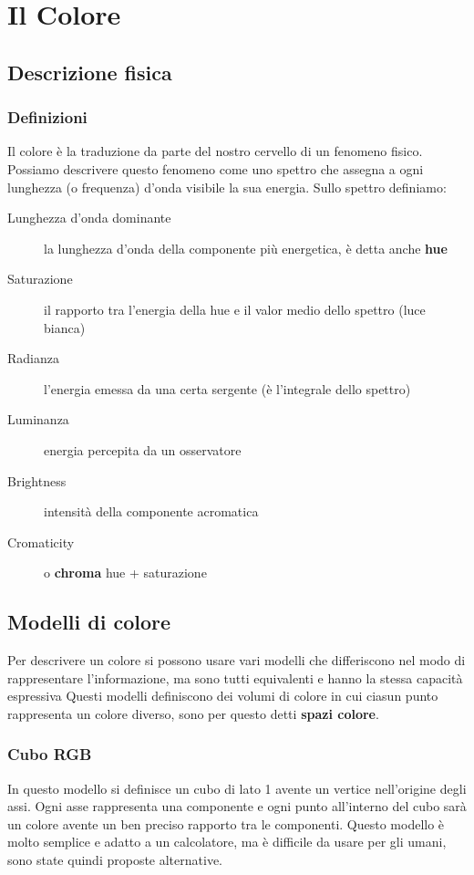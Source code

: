 \chapter{Il Colore}
\section{Descrizione fisica}
\subsection{Definizioni}
Il colore è la traduzione da parte del nostro cervello di un fenomeno fisico. Possiamo descrivere questo fenomeno come uno spettro che assegna a ogni lunghezza (o frequenza) d'onda visibile la sua energia. Sullo spettro definiamo:
\begin{description}
	\item[Lunghezza d'onda dominante] la lunghezza d'onda della componente più energetica, è detta anche \textbf{hue}
	\item[Saturazione] il rapporto tra l'energia della hue e il valor medio dello spettro (luce bianca)
	\item[Radianza] l'energia emessa da una certa sergente (è l'integrale dello spettro)
	\item[Luminanza] energia percepita da un osservatore
	\item[Brightness] intensità della componente acromatica
	\item[Cromaticity] o \textbf{chroma} hue + saturazione
\end{description}

\section{Modelli di colore}\label{sec:color_model}
Per descrivere un colore si possono usare vari modelli che differiscono nel modo di rappresentare l'informazione, ma sono tutti equivalenti e hanno la stessa capacità espressiva Questi modelli definiscono dei volumi di colore in cui ciasun punto rappresenta un colore diverso, sono per questo detti \textbf{spazi colore}.
\subsection{Cubo RGB}
In questo modello si definisce un cubo di lato 1 avente un vertice nell'origine degli assi. Ogni asse rappresenta una componente e ogni punto all'interno del cubo sarà un colore avente un ben preciso rapporto tra le componenti. Questo modello è molto semplice e adatto a un calcolatore, ma è difficile da usare per gli umani, sono state quindi proposte alternative.
